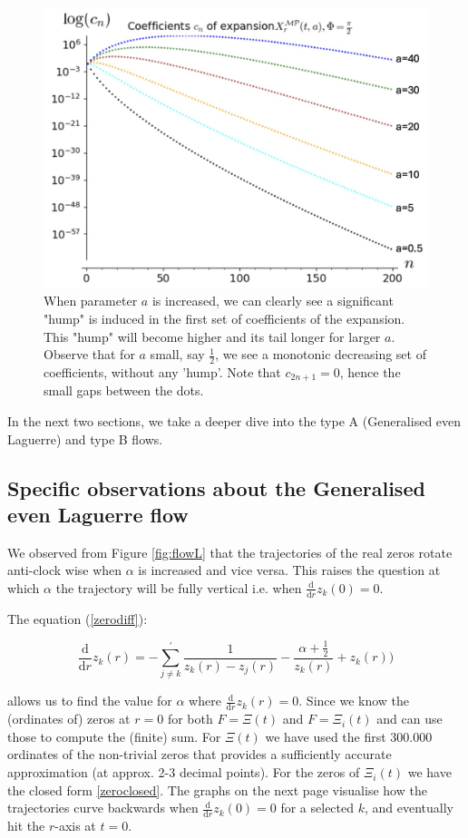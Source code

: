 \documentclass[a4paper,11pt,twoside]{amsart}
\newcommand{\verifiedeq}{=}
\newcommand{\verifiedeq}{\stackrel{\checkmark}{=}}
\begin{document}
\begin{figure}[H]
  \includegraphics[width=0.8\linewidth]{MeixCoeff.jpg}
  \caption{When parameter $a$ is increased, we can clearly see a significant "hump" is induced in the first set of coefficients of the expansion. This "hump" will become higher and its tail longer for larger $a$. Observe that for $a$ small, say $\frac12$, we see a monotonic decreasing set of coefficients, without any 'hump'. Note that $c_{2n+1}=0$, hence the small gaps between the dots.}
  \label{fig:MeixCoeff}
\end{figure}   

In the next two sections, we take a deeper dive into the type A (Generalised even Laguerre) and type B flows.

\subsection{Specific observations about the Generalised even Laguerre flow}

We observed from Figure \ref{fig:flowL} that the trajectories of the real zeros rotate anti-clock wise when $\alpha$ is increased and vice versa. This raises the question at which $\alpha$ the trajectory will be fully vertical i.e. when $\frac{\mathrm{d}}{\mathrm{d} r} z_k(0) = 0$.

The equation (\ref{zerodiff}):

\begin{equation}
\frac{\mathrm{d}}{\mathrm{d} r} z_k(r)\verifiedeq-\sum_{j \ne k}^{'} \frac{1}{z_k(r)-z_j(r)} -\frac{\alpha+\frac12}{z_k(r)}+z_k(r))
\end{equation}

allows us to find the value for $\alpha$ where $\frac{\mathrm{d}}{\mathrm{d} r} z_k(r) = 0$. Since we know the (ordinates of) zeros at $r=0$ for both $F= \Xi(t)$ and $F= \Xi_i(t)$ and can use those to compute the (finite) sum. For $\Xi(t)$ we have used the first $300.000$ ordinates of the non-trivial zeros that provides a sufficiently accurate approximation (at approx. 2-3 decimal points). For the zeros of $\Xi_i(t)$ we have the closed form \ref{zeroclosed}. The graphs on the next page visualise how the trajectories curve backwards when $\frac{\mathrm{d}}{\mathrm{d} r} z_k(0) = 0$ for a selected $k$, and eventually hit the $r$-axis at $t=0$. 
\end{document}
